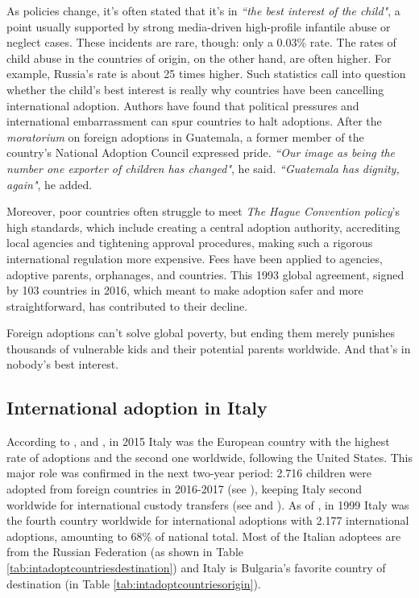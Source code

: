 As policies change, it's often stated that it's in \textit{``the best interest of the child"}, a point usually supported by strong media-driven high-profile infantile abuse or neglect cases. These incidents are rare, though: only a 0.03\% rate. The rates of child abuse in the countries of origin, on the other hand, are often higher. For example, Russia's rate is about 25 times higher. Such statistics call into question whether the child's best interest is really why countries have been cancelling international adoption. Authors have found that political pressures and international embarrassment can spur countries to halt adoptions. After the \textit{moratorium} on foreign adoptions in Guatemala, a former member of the country's National Adoption Council expressed pride. \textit{``Our image as being the number one exporter of children has changed"}, he said. \textit{``Guatemala has dignity, again"}, he added.

Moreover, poor countries often struggle to meet \textit{The Hague Convention policy}'s high standards, which include creating a central adoption authority, accrediting local agencies and tightening approval procedures, making such a rigorous international regulation more expensive. Fees have been applied to agencies, adoptive parents, orphanages, and countries. This 1993 global agreement, signed by 103 countries in 2016, which meant to make adoption safer and more straightforward, has contributed to their decline.

Foreign adoptions can't solve global poverty, but ending them merely punishes thousands of vulnerable kids and their potential parents worldwide. And that's in nobody's best interest.

\subsection{International adoption in Italy}\label{sub:intadoptioninitaly}
According to \cite{notonlyinfectious}, \cite{nonsoloinfezioni} and \cite{cai2014}, in 2015 Italy was the European country with the highest rate of adoptions and the second one worldwide, following the United States. This major role was confirmed in the next two-year period: 2.716 children were adopted from foreign countries in 2016-2017 (see \cite{cai2016}), keeping Italy second worldwide for international custody transfers (see \cite{adoptdropping_article} and \cite{adoptdropping_book}).
As of \cite{unreport}, in 1999 Italy was the fourth country worldwide for international adoptions with 2.177 international adoptions, amounting to 68\% of national total. Most of the Italian adoptees are from the Russian Federation (as shown in Table \ref{tab:intadoptcountriesdestination}) and Italy is Bulgaria's favorite country of destination (in Table \ref{tab:intadoptcountriesorigin}).

